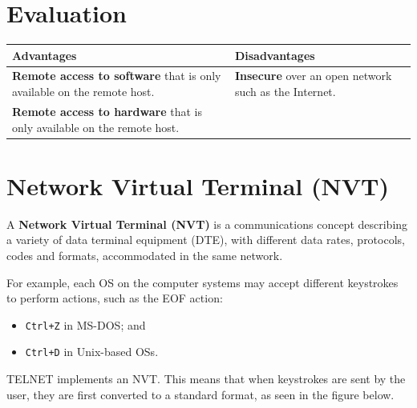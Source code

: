 \documentclass[a4paper]{systems-software}
\begin{document}
\section*{Evaluation}

\begin{longtabu} to \textwidth {| X[1,l] | X[1,l] |}
	\hline
	\textbf{Advantages} & \textbf{Disadvantages}
	\\ \hline
	\textbf{Remote access to software} that is only available on the remote host. &
	\textbf{Insecure} over an open network such as the Internet.
	\\ \hline
	\textbf{Remote access to hardware} that is only available on the remote host. &
	\\ \hline
\end{longtabu}


\section*{Network Virtual Terminal (NVT)}

A \textbf{Network Virtual Terminal (NVT)} is a communications concept describing a variety of data terminal equipment (DTE), with different data rates, protocols, codes and formats, accommodated in the same network.

For example, each OS on the computer systems may accept different keystrokes to perform actions, such as the EOF action:
\begin{itemize}
	\item \texttt{Ctrl+Z} in MS-DOS; and
	\item \texttt{Ctrl+D} in Unix-based OSs.
\end{itemize}

TELNET implements an NVT. This means that when keystrokes are sent by the user, they are first converted to a standard format, as seen in the figure below.
\end{document}

